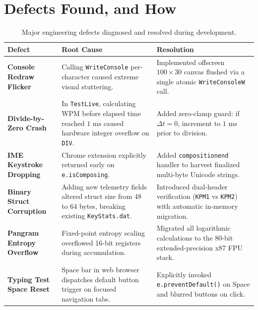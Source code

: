 \documentclass[11pt,a4paper]{article}
\begin{document}
\section{Defects Found, and How}

\begin{table}[htbp]
\centering
\small
\begin{tabularx}{\textwidth}{lXX}
  \toprule
  \textbf{Defect} & \textbf{Root Cause} & \textbf{Resolution} \\
  \midrule
  \textbf{Console Redraw Flicker} & Calling \texttt{WriteConsole} per-character caused extreme visual stuttering. & Implemented offscreen $100 \times 30$ canvas flushed via a single atomic \texttt{WriteConsoleW} call. \\
  \addlinespace
  \textbf{Divide-by-Zero Crash} & In \texttt{TestLive}, calculating WPM before elapsed time reached $1\text{ ms}$ caused hardware integer overflow on \texttt{DIV}. & Added zero-clamp guard: if $\Delta t = 0$, increment to $1\text{ ms}$ prior to division. \\
  \addlinespace
  \textbf{IME Keystroke Dropping} & Chrome extension explicitly returned early on \texttt{e.isComposing}. & Added \texttt{compositionend} handler to harvest finalized multi-byte Unicode strings. \\
  \addlinespace
  \textbf{Binary Struct Corruption} & Adding new telemetry fields altered struct size from 48 to 64 bytes, breaking existing \texttt{KeyStats.dat}. & Introduced dual-header verification (\texttt{KPM1} vs \texttt{KPM2}) with automatic in-memory migration. \\
  \addlinespace
  \textbf{Pangram Entropy Overflow} & Fixed-point entropy scaling overflowed 16-bit registers during accumulation. & Migrated all logarithmic calculations to the 80-bit extended-precision x87 FPU stack. \\
  \addlinespace
  \textbf{Typing Test Space Reset} & Space bar in web browser dispatches default button trigger on focused navigation tabs. & Explicitly invoked \texttt{e.preventDefault()} on Space and blurred buttons on click. \\
  \bottomrule
\end{tabularx}
\caption{Major engineering defects diagnosed and resolved during development.}
\label{tab:defects}
\end{table}

\end{document}
